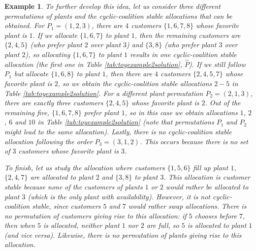 \documentclass[preprint,11pt,authoryear]{elsarticle}
\newtheorem{example}{Example}
\begin{document}
\begin{example}
    
    To further develop this idea, let us consider three different permutations of plants and the cyclic-coalition stable allocations that can be obtained. For $P_1=(1,2,3)$, there are $4$ customers $\{1,6,7,8\}$ whose favorite plant is $1$. If we allocate $\{1,6,7\}$ to plant $1$, then the remaining customers are $\{2,4,5\}$ (who prefer plant $2$ over plant $3$) and $\{3,8\}$ (who prefer plant $3$ over plant $2$), so allocating $\{1,6,7\}$ to plant $1$ results in one cyclic-coalition stable allocation (the first one in Table \ref{tab:toyexample2solution}, $\hat{P}$). If we still follow $P_1$ but allocate $\{1,6,8\}$ to plant $1$, then there are $4$ customers $\{2,4,5,7\}$ whose favorite plant is $2$, so we obtain the cyclic-coalition stable allocations $2-5$ in Table \ref{tab:toyexample2solution}. For a different plant permutation $P_2=(2,1,3)$, there are exactly three customers $\{2,4,5\}$ whose favorite plant is $2$. Out of the remaining five, $\{1,6,7,8\}$ prefer plant $1$, so in this case we obtain allocations $1$, $2$, $6$ and $10$ in Table \ref{tab:toyexample2solution} (note that permutations $P_1$ and $P_2$ might lead to the same allocation). Lastly, there is no cyclic-coalition stable allocation following the order $P_3=(3,1,2)$. This occurs because there is no set of $3$ customers whose favorite plant is $3$. 
    
    

To finish, let us study the allocation where customers $\{1,5,6\}$ fill up plant $1$, $\{2,4,7\}$ are allocated to plant $2$ and $\{3,8\}$ to plant $3$. This allocation is customer stable because none of the customers of plants $1$ or $2$ would rather be allocated to plant $3$ (which is the only plant with availability). However, it is not cyclic-coalition stable, since customers $5$ and $7$ would rather swap allocations. There is no permutation of customers giving rise to this allocation: if $5$ chooses before $7$, then when $5$ is allocated, neither plant $1$ nor $2$ are full, so $5$ is allocated to plant $1$ (and vice versa). Likewise, there is no permutation of plants giving rise to this allocation.%

    
\end{example}
\end{document}
